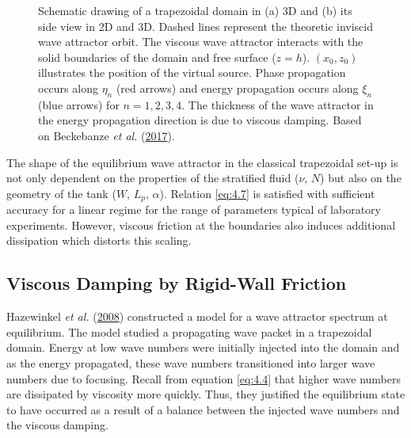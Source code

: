 \documentclass[a4paper]{article}
\numberwithin{equation}{section}
\begin{document}
\begin{figure}[h!]
\begin{subfigure}[t]{.5\textwidth}
  \label{fig:sub2}
  \caption{}
\end{subfigure}
\caption{Schematic drawing of a trapezoidal domain in (a) 3D and (b) its side view in 2D and 3D. Dashed lines represent the theoretic inviscid wave attractor orbit. The viscous wave attractor interacts with the solid boundaries of the domain and free surface ($z = h$). $(x_0, z_0)$ illustrates the position of the virtual source. Phase propagation occurs along $\eta_n$ (red arrows) and energy propagation occurs along $\xi_n$ (blue arrows) for $n = 1, 2, 3, 4$. The thickness of the wave attractor in the energy propagation direction is due to viscous damping. Based on Beckebanze \emph{et al.} (\protect\hyperlink{ref 8}{2017}).}
\label{fig:8}
\end{figure}

The shape of the equilibrium wave attractor in the classical trapezoidal set-up is not only dependent on the properties of the stratified fluid ($\nu$, $N$) but also on the geometry of the tank ($W$, $L_p$, $\alpha$). Relation \eqref{eq:4.7} is satisfied with sufficient accuracy for a linear regime for the range of parameters typical of laboratory experiments. However, viscous friction at the boundaries also induces additional dissipation which distorts this scaling. 

\subsection{Viscous Damping by Rigid-Wall Friction}
Hazewinkel \emph{et al.} (\hyperlink{ref 27}{2008}) constructed a model for a wave attractor spectrum at equilibrium. The model studied a propagating wave packet in a trapezoidal domain. Energy at low wave numbers were initially injected into the domain and as the energy propagated, these wave numbers transitioned into larger wave numbers due to focusing. Recall from equation \eqref{eq:4.4} that higher wave numbers are dissipated by viscosity more quickly. Thus, they justified the equilibrium state to have occurred as a result of a balance between the injected wave numbers and the viscous damping.
\end{document}
